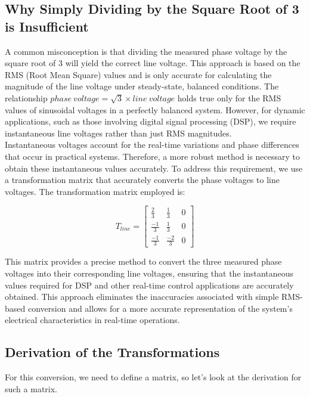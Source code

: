 \subsection{Why Simply Dividing by the Square Root of 3 is Insufficient}
A common misconception is that dividing the measured phase voltage by the
square root of 3 will yield the correct line voltage. This approach is based on
the RMS (Root Mean Square) values and is only accurate for calculating the
magnitude of the line voltage under steady-state, balanced conditions. The
relationship \(phase\ voltage = \sqrt{3} \times line\ voltage\) holds true only
for the RMS values of sinusoidal voltages in a perfectly balanced system.
However, for dynamic applications, such as those involving digital signal
processing (DSP), we require instantaneous line voltages rather than just RMS
magnitudes.\\

Instantaneous voltages account for the real-time variations and phase
differences that occur in practical systems. Therefore, a more robust method is
necessary to obtain these instantaneous values accurately. To address this
requirement, we use a transformation matrix that accurately converts the phase
voltages to line voltages. The transformation matrix employed is:

\begin{equation*}
    T_{line} =
    \begin{bmatrix}
        \frac{2}{3}  & \frac{1}{3}  & 0 \\
        \frac{-1}{3} & \frac{1}{3}  & 0 \\
        \frac{-1}{3} & \frac{-2}{3} & 0
    \end{bmatrix}
\end{equation*}

This matrix provides a precise method to convert the three measured phase
voltages into their corresponding line voltages, ensuring that the
instantaneous values required for DSP and other real-time control applications
are accurately obtained. This approach eliminates the inaccuracies associated
with simple RMS-based conversion and allows for a more accurate representation
of the system's electrical characteristics in real-time operations.

\subsection{Derivation of the Transformations}
For this conversion, we need to define a matrix, so let's look at the
derivation for such a matrix.

